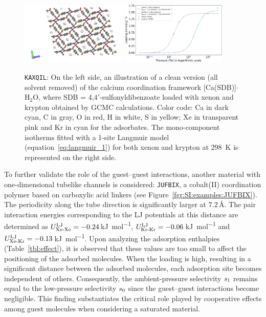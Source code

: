\documentclass[main.tex]{subfiles}
\begin{document}
\begin{figure}[ht]
  \centering
    \includegraphics[width=0.45\textwidth]{figures/2-thermo/KAXQIL_clean.jpg}
    \includegraphics[width=0.45\textwidth]{figures/2-thermo/KAXQIL_clean_isotherm_xenon_krypton_298K.jpg}
    \caption{\texttt{KAXQIL}: On the left side, an illustration of a clean version (all solvent removed) of the calcium coordination framework [Ca(SDB)]$\cdot$H$_2$O, where SDB = 4,$4'$-sulfonyldibenzoate loaded with xenon and krypton obtained by GCMC calculations. Color code: Ca in dark cyan, C in gray, O in red, H in white, S in yellow; Xe in transparent pink and Kr in cyan for the adsorbates. The mono-component isotherms fitted with a 1-site Langmuir model (equation~\ref{eq:langmuir_1}) for both xenon and krypton at \SI{298}{\kelvin} is represented on the right side.}\label{fgr:SI:examples:KAXQIL}
  \end{figure}

To further validate the role of the guest--guest interactions, another material with one-dimensional tubelike channels is considered: \texttt{JUFBIX}, a cobalt(II) coordination polymer based on carboxylic acid linkers (see Figure~\ref{fgr:SI:examples:JUFBIX}).\autocite{JUFBIX} The periodicity along the tube direction is significantly larger at $7.2$\,\si{\angstrom}. The pair interaction energies corresponding to the LJ potentials at this distance are determined as $U^{\text{LJ}}_{\text{Xe-Xe}}=-0.24$\,\si{\kilo\joule\per\mol}, $U^{\text{LJ}}_{\text{Kr-Kr}}=-0.06$\,\si{\kilo\joule\per\mol} and $U^{\text{LJ}}_{\text{Xe-Kr}}=-0.13$\,\si{\kilo\joule\per\mol}. Upon analyzing the adsorption enthalpies (Table~\ref{tbl:effect}), it is observed that these values are too small to affect the positioning of the adsorbed molecules. When the loading is high, resulting in a significant distance between the adsorbed molecules, each adsorption site becomes independent of others. Consequently, the ambient-pressure selectivity $s_{\text{1}}$ remains equal to the low-pressure selectivity $s_{\text{0}}$ since the guest--guest interactions become negligible. This finding substantiates the critical role played by cooperative effects among guest molecules when considering a saturated material.
\end{document}

